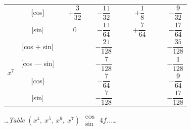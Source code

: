 \documentclass[10pt,a4paper]{article}
\newcommand{\tabletitle}[2]{%
  \begin{center}
  \ldots\textit{Table} #1 $\displaystyle\begin{smallmatrix} \cos \\ \sin \end{smallmatrix}$ #2\ldots
  \end{center}
}
\begin{document}
\begin{center}
\begin{tabular}{|c|c|c|c|c|c|c|c|c|c|c|c|}
& [cos] & & $+\dfrac{3}{32}$ & & $-\dfrac{11}{32}$ & & & $+\dfrac{1}{8}$ & & & $-\dfrac{9}{32}$ \\
& [sin] & & $0$ & & $-\dfrac{11}{64}$ & & & $+\dfrac{7}{64}$ & & & $-\dfrac{17}{64}$ \\
\hline
\multirow{4}{*}{$x^7$} & [cos + sin] & & & & $-\dfrac{21}{128}$ & & & & & & $-\dfrac{35}{128}$ \\
& [cos --- sin] & & & & $-\dfrac{7}{128}$ & & & & & & $-\dfrac{1}{128}$ \\
& [cos] & & & & $-\dfrac{7}{64}$ & & & & & & $-\dfrac{9}{64}$ \\
& [sin] & & & & $-\dfrac{7}{128}$ & & & & & & $-\dfrac{17}{128}$ \\
\hline
\end{tabular}
\end{center}

\vspace{1em}

\tabletitle{$(x^4,\ x^5,\ x^6,\ x^7)$}{$4f\ldots$}
\end{document}
